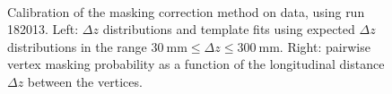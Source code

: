 \begin{figure}[p]
{	}\\
	\caption{Calibration of the masking correction method on data, using run 182013. Left: $\Delta z$ distributions and template fits using expected $\Delta z$ distributions in the range $\SI{30}{\milli\meter}\leq\Delta z\leq\SI{300}{\milli\meter}$. Right: pairwise vertex masking probability as a function of the longitudinal distance $\Delta z$ between the vertices.}
	\label{fig:masking-correction-data}
\end{figure}

\begin{figure}[p]
	\centering
\end{figure}
